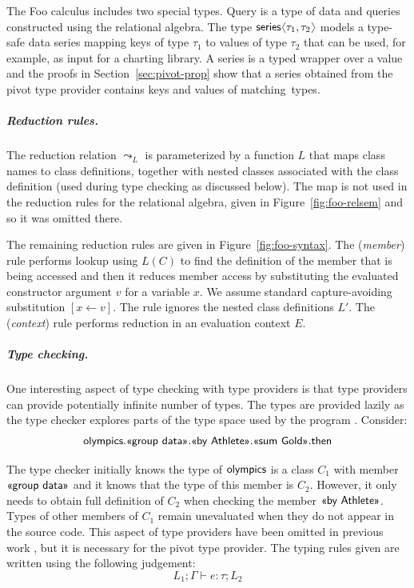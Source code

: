 \documentclass[a4paper,UKenglish]{lipics-v2016}
\theoremstyle{plain}
\theoremstyle{definition}
\newcommand{\langl}{\begin{picture}(4.5,7)
\put(1.1,2.5){\rotatebox{60}{\line(1,0){5.5}}}
\put(1.1,2.5){\rotatebox{300}{\line(1,0){5.5}}}
\end{picture}}
\newcommand{\rangl}{\begin{picture}(4.5,7)
\put(.9,2.5){\rotatebox{120}{\line(1,0){5.5}}}
\put(.9,2.5){\rotatebox{240}{\line(1,0){5.5}}}
\end{picture}}
\newcommand{\ident}[1]{\textnormal{\sffamily #1}}
\newcommand{\qident}[1]{\textnormal{\sffamily \guillemotleft #1\guillemotright}}
\begin{document}
The Foo calculus includes two special types. \ident{Query} is a type of data and queries 
constructed using the relational algebra. The type $\ident{series}\langl \tau_1, \tau_2 \rangl$ 
models a type-safe data series mapping keys of type $\tau_1$ to values of type $\tau_2$ that
can be used, for example, as input for a charting library. A series is a typed wrapper over a 
 value and the proofs in Section~\ref{sec:pivot-prop} show that a series obtained 
from the pivot type provider contains keys and values of matching~types.

\subparagraph{Reduction rules.} The reduction relation $\leadsto_L$ is parameterized by a function
$L$ that maps class names to class definitions, together with nested classes associated with the
class definition (used during type checking as discussed below). The map is not used in the 
reduction rules for the relational algebra, given in Figure~\ref{fig:foo-relsem} and so it was 
omitted there.

The remaining reduction rules are given in Figure~\ref{fig:foo-syntax}. The (\emph{member}) rule 
performs lookup using $L(C)$ to find the definition of the member that is being accessed and then
it reduces member access by substituting the evaluated constructor argument $v$ for a variable $x$.
We assume standard capture-avoiding substitution $[x\leftarrow v]$. The rule ignores the nested 
class definitions $L'$. The (\emph{context}) rule performs reduction in an evaluation context $E$.

\subparagraph{Type checking.} One interesting aspect of type checking with type providers is that
type providers can provide potentially infinite number of types. The types are provided 
lazily as the type checker explores parts of the type space used by the program \cite{inforich}. 
Consider:
%
\begin{equation*}
\ident{olympics}.\qident{group data}.\qident{by Athlete}.\qident{sum Gold}.\ident{then}
\end{equation*}

\noindent
The type checker initially knows the type of $\ident{olympics}$ is a class $C_1$ with member 
$\qident{group data}$ and it knows that the type of this member is $C_2$. However, it only needs to 
obtain full definition of $C_2$ when checking the member $\qident{by Athlete}$. Types of other 
members of $C_1$ remain unevaluated when they do not appear in the source code. This aspect of type
providers have been omitted in previous work \cite{fsdata,liteq}, but it is necessary for the pivot type provider.
The typing rules given are written using the following judgement:
%
\begin{equation*}
L_1; \Gamma \vdash e : \tau; L_2
\end{equation*}
\end{document}
